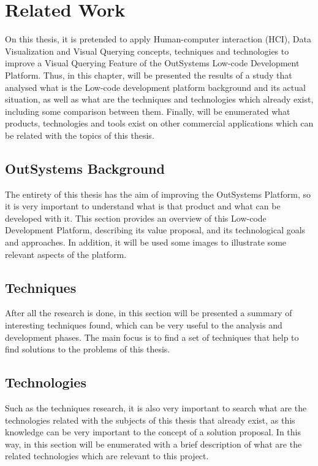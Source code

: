 \chapter{Related Work}
\label{cha:related_work}
On this thesis, it is pretended to apply Human-computer interaction (HCI), Data 
Visualization and Visual Querying concepts, techniques and technologies to improve 
a Visual Querying Feature of the OutSystems Low-code Development Platform. Thus, 
in this chapter, will be presented the results of a study that analysed what is 
the Low-code development platform background and its actual situation, as well as 
what are the techniques and technologies which already exist, including some 
comparison between them. Finally, will be enumerated what products, technologies 
and tools exist on other commercial applications which can be related with the 
topics of this thesis.

\section{OutSystems Background}
\label{sec:outsystems_background}
The entirety of this thesis has the aim of improving the OutSystems Platform, so it is 
very important to understand what is that product and what can be developed with 
it.
This section provides an overview of this Low-code Development Platform, 
describing its value proposal, and its technological goals and approaches. In 
addition, it will be used some images to illustrate some relevant aspects of the 
platform.

\section{Techniques}
\label{sec:techniques}
After all the research is done, in this section will be presented a summary of 
interesting techniques found, which can be very useful to the analysis and 
development phases. The main focus is to find a set of techniques that help 
to find solutions to the problems of this thesis.

\section{Technologies}
\label{sec:technologies}
Such as the techniques research, it is also very important to search what are 
the technologies related with the subjects of this thesis that already exist, 
as this knowledge can be very important to the concept of a solution proposal.
In this way, in this section will be enumerated with a brief description of what 
are the related technologies which are relevant to this project. 


